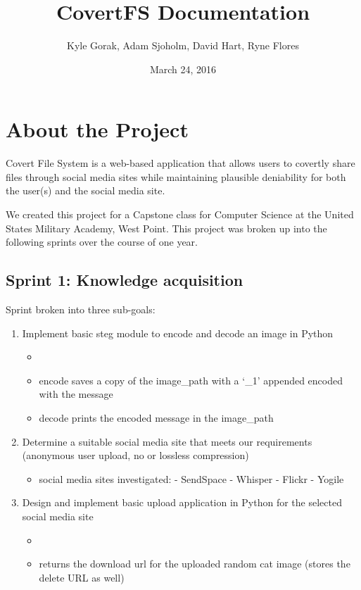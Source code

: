 \documentclass[letterpaper,12pt,openany,oneside]{sphinxmanual}
\title{CovertFS Documentation}
\date{March 24, 2016}
\author{Kyle Gorak, Adam Sjoholm, David Hart, Ryne Flores}
\begin{document}
\maketitle
\tableofcontents
{}\label{index::doc}


\chapter{About the Project}
\label{index:about-the-project}
Covert File System is a web-based application that allows users to covertly share files through social media sites while maintaining plausible deniability for both the user(s) and the social media site.

We created this project for a Capstone class for Computer Science at the United States Military Academy, West Point. This project was broken up into the following sprints over the course of one year.


\section{Sprint 1: Knowledge acquisition}
\label{index:sprint-1-knowledge-acquisition}
Sprint broken into three sub-goals:
\begin{enumerate}
\item {} 
Implement basic steg module to encode and decode an image in Python
\begin{itemize}
\item {} 

\item {} 
encode saves a copy of the image\_path with a `\_1' appended encoded with the message

\item {} 
decode prints the encoded message in the image\_path

\end{itemize}

\item {} 
Determine a suitable social media site that meets our requirements (anonymous user upload, no or lossless compression)
\begin{itemize}
\item {} 
social media sites investigated:
- SendSpace
- Whisper
- Flickr
- Yogile

\end{itemize}

\item {} 
Design and implement basic upload application in Python for the selected social media site
\begin{itemize}
\item {} 

\item {} 
returns the download url for the uploaded random cat image (stores the delete URL as well)

\end{itemize}

\end{enumerate}
\end{document}
